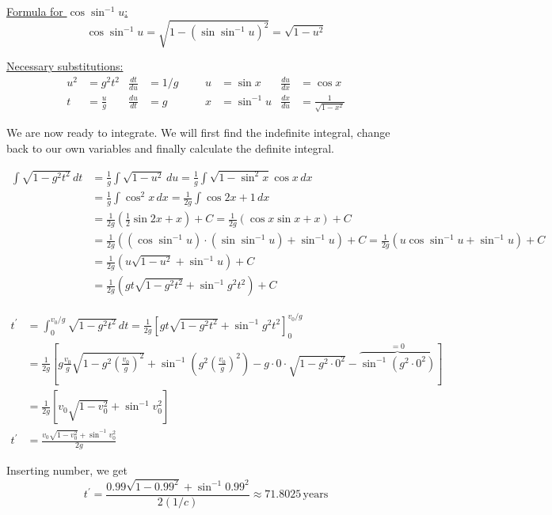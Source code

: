 \documentclass[a4paper,10pt,english]{article}
\begin{document}
\begin{enumerate}
\begin{enumerate}
\underline{Formula for $\cos{\sin^{-1}{u}}$:}
\begin{equation*}
\cos{\sin^{-1}{u}}=\sqrt{1-(\sin{\sin^{-1}{u}})^{2}}=\sqrt{1-u^{2}}
\end{equation*}

\underline{Necessary substitutions:}
\begin{align*}
u^{2}&=g^{2}t^{2} & \frac{dt}{du}&=1/g  &&&  u&=\sin{x} & \frac{du}{dx}&=\cos{x}\\
t&=\frac{u}{g} & \frac{du}{dt}&=g     &&& x&=\sin^{-1}{u} & \frac{dx}{du}&=\frac{1}{\sqrt{1-x^{2}}}
\end{align*}

We are now ready to integrate. We will first find the indefinite integral, change back to our own variables and finally calculate the definite integral. 

\begin{align*}
\int\sqrt{1-g^{2}t^{2}}\,dt&=\frac{1}{g}\int\sqrt{1-u^{2}}\,du=\frac{1}{g}\int\sqrt{1-\sin^{2}{x}}\cos{x}\,dx\\
&=\frac{1}{g}\int\cos^{2}{x}\,dx=\frac{1}{2g}\int\cos{2x}+1\,dx\\
&=\frac{1}{2g}\left(\frac{1}{2}\sin{2x}+x\right)+C=\frac{1}{2g}\left(\cos{x}\sin{x}+x\right)+C\\
&=\frac{1}{2g}\left((\cos{\sin^{-1}{u}})\cdot(\sin{\sin^{-1}{u}})+\sin^{-1}{u}\right)+C=\frac{1}{2g}\left(u\cos{\sin^{-1}{u}}+\sin^{-1}{u}\right)+C\\
&=\frac{1}{2g}\left(u\sqrt{1-u^{2}}+\sin^{-1}{u}\right)+C\\
&=\frac{1}{2g}\left(gt\sqrt{1-g^{2}t^{2}}+\sin^{-1}{g^{2}t^{2}}\right)+C
\end{align*}

\begin{align*}
t^{\prime}&=\int_{0}^{v_{0}/g}\sqrt{1-g^{2}t^{2}}\,dt=\frac{1}{2g}\left[gt\sqrt{1-g^{2}t^{2}}+\sin^{-1}{g^{2}t^{2}}\right]_{0}^{v_{0}/g}\\
&=\frac{1}{2g}\left[g\frac{v_{0}}{g}\sqrt{1-g^{2}\left(\frac{v_{0}}{g}\right)^{2}}+\sin^{-1}\left({g^{2}\left(\frac{v_{0}}{g}\right)^{2}}\right)-g\cdot0\cdot\sqrt{1-g^{2}\cdot0^{2}}-\overbrace{\sin^{-1}\left({g^{2}\cdot0^{2}}\right)}^{=0}\right]\\
&=\frac{1}{2g}\left[v_{0}\sqrt{1-v_{0}^{2}}+\sin^{-1}{v_{0}^{2}}\right]\\
t^{\prime}&=\frac{v_{0}\sqrt{1-v_{0}^{2}}+\sin^{-1}{v_{0}^{2}}}{2g}
\end{align*}


Inserting number, we get
\[t^{\prime}=\frac{0.99\sqrt{1-0.99^{2}}+\sin^{-1}{0.99^{2}}}{2(1/c)}\approx71.8025\,\text{years}\]


\end{enumerate}
\end{enumerate}
\end{document}
